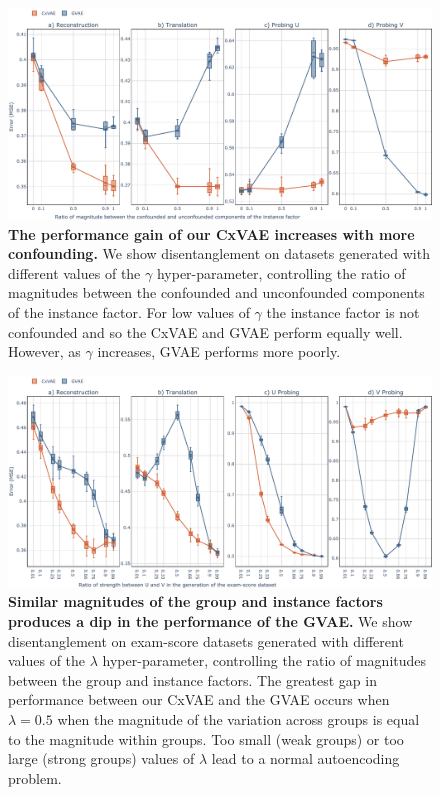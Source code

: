 \documentclass[nohyperref]{article}
\theoremstyle{plain}
\theoremstyle{definition}
\theoremstyle{remark}
\begin{document}
\begin{figure}[t]
\vskip 0.2in
\begin{center}
\centerline{\includegraphics[width=\textwidth]{files/xy_ratio.pdf}}
\caption{\textbf{The performance gain of our CxVAE increases with more confounding.} We show disentanglement on datasets generated with different values of the $\gamma$ hyper-parameter, controlling the ratio of magnitudes between the confounded and unconfounded components of the instance factor. For low values of $\gamma$ the instance factor is not confounded and so the CxVAE and GVAE perform equally well. However, as $\gamma$ increases, GVAE performs more poorly.}
\label{fig:xy}
\end{center}
\vskip -0.2in
\end{figure}

\begin{figure}[t]
\vskip 0.2in
\begin{center}
\centerline{\includegraphics[width=\textwidth]{files/uv_ratio.pdf}}
\caption{\textbf{Similar magnitudes of the group and instance factors produces a dip in the performance of the GVAE. } We show disentanglement on exam-score datasets generated with different values of the $\lambda$ hyper-parameter, controlling the ratio of magnitudes between the group and instance factors.  The greatest gap in performance between our CxVAE and the GVAE occurs when $\lambda=0.5$ when the magnitude of the variation across groups is equal to the magnitude within groups.  Too small (weak groups) or too large (strong groups) values of $\lambda$ lead to a normal autoencoding problem.}
\label{fig:uv}
\end{center}
\vskip -0.2in
\end{figure}
\end{document}
